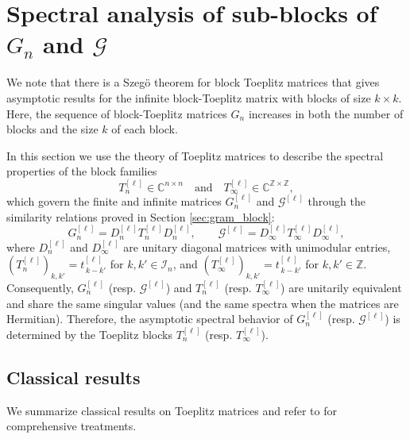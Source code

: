 \documentclass{article}
\begin{document}





    


\section{Spectral analysis of sub-blocks of $G_n$ and $\mathscr{G}$}\label{sec:asymptotic}



We note that there is a Szeg\"{o} theorem for block Toeplitz matrices \cite{miranda2000asymptotic, gutierrez2008asymptotically, gutierrez2012block} that gives asymptotic results for the infinite block-Toeplitz matrix with blocks of size $k\times k$. Here, the sequence of block-Toeplitz matrices $G_n$ increases in both the number of blocks and the size $k$ of each block.

In this section we use the theory of Toeplitz matrices to describe the spectral properties of the block families
\[
T_n^{[\ell]}\in\mathbb{C}^{n\times n} \quad\text{and}\quad 
T_{\infty}^{[\ell]}\in\mathbb{C}^{\mathbb{Z}\times\mathbb{Z}},
\]
which govern the finite and infinite matrices $G_n^{[\ell]}$ and $\mathscr{G}^{[\ell]}$ through the  similarity relations proved in Section \ref{sec:gram_block}:
\[
G_n^{[\ell]} = D_n^{[\ell]} T_n^{[\ell]} D_n^{[\ell]}, 
\qquad 
\mathscr{G}^{[\ell]} = D_{\infty}^{[\ell]} T_{\infty}^{[\ell]} D_{\infty}^{[\ell]},
\]
where $D_n^{[\ell]}$ and $D_{\infty}^{[\ell]}$ are unitary diagonal matrices with unimodular entries, $(T_n^{[\ell]})_{k,k'}= t^{[\ell]}_{\,k-k'}$ for $k,k'\in \mathcal{I}_n$, and $(T_{\infty}^{[\ell]})_{k,k'}=t^{[\ell]}_{\,k-k'}$ for $k,k'\in \mathbb{Z}$.
Consequently, $G_n^{[\ell]}$ (resp. $\mathscr{G}^{[\ell]}$) and 
$T_n^{[\ell]}$ (resp. $T_{\infty}^{[\ell]}$) are unitarily equivalent and
share the same singular values (and the same spectra when the matrices are Hermitian).
Therefore, the asymptotic spectral behavior of $G_n^{[\ell]}$ (resp. $\mathscr{G}^{[\ell]}$)
is determined by the Toeplitz blocks $T_n^{[\ell]}$ (resp. $T_{\infty}^{[\ell]}$).










\subsection{Classical results}
We summarize classical results on Toeplitz matrices and refer to \cite{gray2006toeplitz, MR36936, zhu2017asymptotic, bottcher2000toeplitz} for comprehensive treatments.
\end{document}

